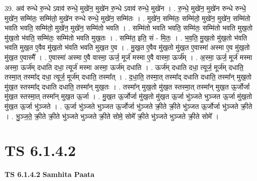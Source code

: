 \documentclass[17pt]{extarticle}
\begin{document}
39. अव॑ रुन्धे रु॒न्धे ऽवाव॑ रुन्धे॒ मुखे॑न॒ मुखे॑न रु॒न्धे ऽवाव॑ रुन्धे॒ मुखे॑न । . रु॒न्धे॒ मुखे॑न॒ मुखे॑न रुन्धे रुन्धे॒ मुखे॑न॒ सम्मि॑तः॒ सम्मि॑तो॒ मुखे॑न रुन्धे रुन्धे॒ मुखे॑न॒ सम्मि॑तः । . मुखे॑न॒ सम्मि॑तः॒ सम्मि॑तो॒ मुखे॑न॒ मुखे॑न॒ सम्मि॑तो भवति भवति॒ सम्मि॑तो॒ मुखे॑न॒ मुखे॑न॒ सम्मि॑तो भवति । . सम्मि॑तो भवति भवति॒ सम्मि॑तः॒ सम्मि॑तो भवति मुख॒तो मु॑ख॒तो भ॑वति॒ सम्मि॑तः॒ सम्मि॑तो भवति मुख॒तः । . सम्मि॑त॒ इति॒ सं - मि॒तः॒ । . भ॒व॒ति॒ मु॒ख॒तो मु॑ख॒तो भ॑वति भवति मुख॒त ए॒वैव मु॑ख॒तो भ॑वति भवति मुख॒त ए॒व । . मु॒ख॒त ए॒वैव मु॑ख॒तो मु॑ख॒त ए॒वास्मा॑ अस्मा ए॒व मु॑ख॒तो मु॑ख॒त ए॒वास्मै᳚ । . ए॒वास्मा॑ अस्मा ए॒वै वास्मा॒ ऊर्ज॒ मूर्ज॑ मस्मा ए॒वै वास्मा॒ ऊर्ज᳚म् । . अ॒स्मा॒ ऊर्ज॒ मूर्ज॑ मस्मा अस्मा॒ ऊर्ज॑म् दधाति दधा॒ त्यूर्ज॑ मस्मा अस्मा॒ ऊर्ज॑म् दधाति । . ऊर्ज॑म् दधाति दधा॒ त्यूर्ज॒ मूर्ज॑म् दधाति॒ तस्मा॒त् तस्मा᳚द् दधा॒ त्यूर्ज॒ मूर्ज॑म् दधाति॒ तस्मा᳚त् । . द॒धा॒ति॒ तस्मा॒त् तस्मा᳚द् दधाति दधाति॒ तस्मा᳚न् मुख॒तो मु॑ख॒त स्तस्मा᳚द् दधाति दधाति॒ तस्मा᳚न् मुख॒तः । . तस्मा᳚न् मुख॒तो मु॑ख॒त स्तस्मा॒त् तस्मा᳚न् मुख॒त ऊ॒र्जोर्जा मु॑ख॒त स्तस्मा॒त् तस्मा᳚न् मुख॒त ऊ॒र्जा । . मु॒ख॒त ऊ॒र्जोर्जा मु॑ख॒तो मु॑ख॒त ऊ॒र्जा भु॑ञ्जते भुञ्जत ऊ॒र्जा मु॑ख॒तो मु॑ख॒त ऊ॒र्जा भु॑ञ्जते । . ऊ॒र्जा भु॑ञ्जते भुञ्जत ऊ॒र्जोर्जा भु॑ञ्जते क्री॒ते क्री॒ते भु॑ञ्जत ऊ॒र्जोर्जा भु॑ञ्जते क्री॒ते । . भु॒ञ्ज॒ते॒ क्री॒ते क्री॒ते भु॑ञ्जते भुञ्जते क्री॒ते सोमे॒ सोमे᳚ क्री॒ते भु॑ञ्जते भुञ्जते क्री॒ते सोमे᳚ । \newline
\pagebreak
{}

\section{ TS 6.1.4.2 }

\textbf{TS 6.1.4.2 } \newline
\textbf{Samhita Paata} \newline
\end{document}
